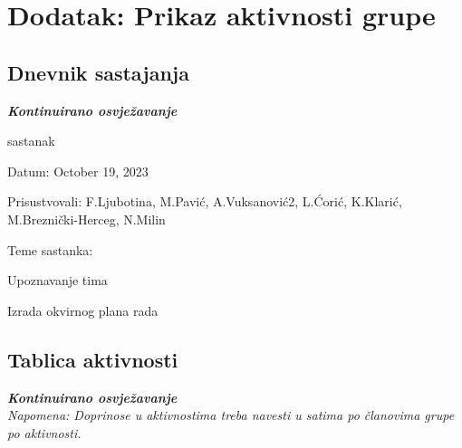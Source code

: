 \chapter*{Dodatak: Prikaz aktivnosti grupe}
		
		\section*{Dnevnik sastajanja}
		
		\textbf{\textit{Kontinuirano osvježavanje}}\\
		
		\begin{packed_enum}
			\item  sastanak
			
			\item[] \begin{packed_item}
				\item Datum: October 19, 2023
				\item Prisustvovali: F.Ljubotina, M.Pavić, A.Vuksanović2, L.Ćorić, K.Klarić, M.Breznički-Herceg, N.Milin
				\item Teme sastanka:
				\begin{packed_item}
					\item  Upoznavanje tima 
					\item  Izrada okvirnog plana rada
				\end{packed_item}
			\end{packed_item}
			
			
		\end{packed_enum}
		
		\eject
		\section*{Tablica aktivnosti}
		
			\textbf{\textit{Kontinuirano osvježavanje}}\\
			
			 \textit{Napomena: Doprinose u aktivnostima treba navesti u satima po članovima grupe po aktivnosti.}

